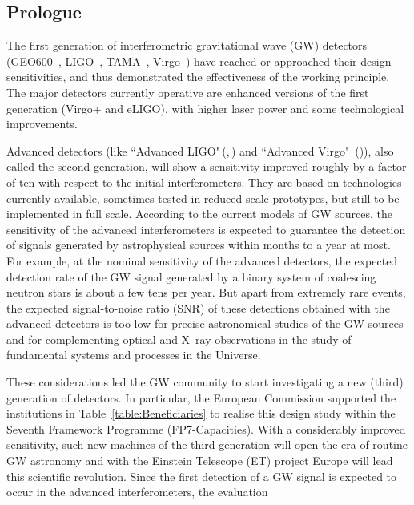 
%
%
%
\subsection[Prologue]{Prologue}
\label{Prologue}
The first generation of interferometric gravitational wave (GW) detectors 
(GEO600~\cite{GEO600Grote2008}, LIGO~\cite{Abbott2009}, 
TAMA~\cite{Arai2008}, Virgo~\cite{VirgoStatus2008}) have reached or 
approached their design sensitivities, and thus demonstrated the 
effectiveness of the working principle. The major detectors currently 
operative are enhanced versions of the first generation (Virgo+ and eLIGO), 
with higher laser power and some technological improvements. \par
Advanced detectors (like ``Advanced LIGO"\,(\cite{AdvancedLIGOReference2009},\,\cite{aLIGO}) and ``Advanced Virgo" \,(\cite{AdV2009})), also 
called the second generation, will show a sensitivity improved roughly by 
a factor of ten with respect to the initial interferometers. They are based on 
technologies currently available, sometimes tested in reduced scale 
prototypes, but still to be implemented in full scale. According to the current 
models of GW sources, the sensitivity of the advanced interferometers is 
expected to guarantee the detection of signals generated by astrophysical 
sources within months to a year at most. For example, at the nominal sensitivity 
of the advanced detectors, the expected detection rate of the GW signal 
generated by a binary system of coalescing neutron stars is about a few tens 
per year. But apart from extremely rare events, the expected signal-to-noise 
ratio (SNR) of these detections obtained with the advanced detectors is too low 
for precise astronomical studies of the GW sources and for complementing 
optical and X--ray observations in the study of fundamental systems and 
processes in the Universe. \par
These considerations led the GW community to start investigating a new (third) 
generation of detectors. In particular, the European Commission supported the 
institutions in Table~\ref{table:Beneficiaries} to realise this design study within 
the Seventh Framework Programme (FP7-Capacities). With a considerably 
improved sensitivity, such new machines of the third-generation will open the 
era of routine GW astronomy and with the Einstein Telescope (ET) project 
Europe will lead this scientific revolution. Since the first detection of a GW 
signal is expected to occur in the advanced interferometers, the evaluation 
